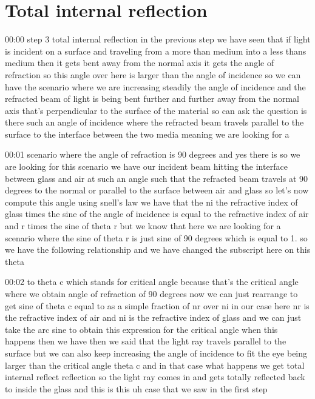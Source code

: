 \section{Total internal reflection}

00:00
step 3 total internal reflection in the previous step we have seen that
if light is incident on a surface and traveling from a more than
medium into a less thans medium then it gets
bent away from the normal axis it gets the angle of
refraction so this angle over here is larger than the angle of incidence
so we can have the scenario where we are increasing
steadily the angle of incidence and the refracted beam of light
is being bent further and further away from the normal
axis that's perpendicular to the surface of the material
so can ask the question is there such an angle of incidence
where the refracted beam travels parallel to the surface to the
interface between the two media meaning we are looking for a

00:01
scenario where the angle of refraction is 90 degrees and yes there is
so we are looking for this scenario we have our incident beam
hitting the interface between glass and air at such an angle
such that the refracted beam travels at 90 degrees to the normal
or parallel to the surface between air and glass
so let's now compute this angle using snell's law
we have that the ni the refractive index of glass
times the sine of the angle of incidence is equal to the refractive index
of air and r times the sine of theta r but we know that here we are looking
for a scenario where the sine of theta r is just sine of 90 degrees which
is equal to 1. so we have the following relationship
and we have changed the subscript here on this theta

00:02
to theta c which stands for critical angle
because that's the critical angle where we obtain angle of refraction of 90
degrees now we can just rearrange to get sine
of theta c equal to as a simple fraction of nr over ni in our case here nr
is the refractive index of air and ni is the refractive index of glass
and we can just take the arc sine to obtain
this expression for the critical angle when this happens then we have then we
said that the light ray travels parallel to the
surface but we can also keep increasing the angle of incidence
to fit the eye being larger than the critical angle theta c
and in that case what happens we get total internal reflect
reflection so the light ray comes in and gets totally reflected back to
inside the glass and this is this uh case that we saw in the first step

